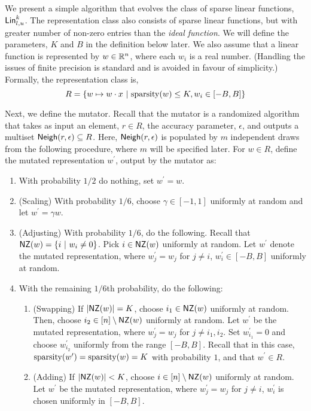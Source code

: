 We present a simple algorithm that evolves the class of sparse linear functions,
$\mathsf{Lin}^k_{l, u}$.  The representation class also consists of sparse linear
functions, but with greater number of non-zero entries than the \emph{ideal
function}. We will define the parameters, $K$ and $B$ in the definition below
later. We also assume that a linear function is represented by $w \in \mathbb{R}^n$,
where each $w_i$ is a real number. (Handling the issues of finite precision is
standard and is avoided in favour of simplicity.) Formally, the representation
class is,
\[ 
R = \{ w \mapsto w \cdot x ~|~ \mathrm{sparsity}(w) \leq K, w_i \in [-B, B] \}
\]

Next, we define the mutator. Recall that the mutator is a randomized algorithm
that takes as input an element, $r \in R$, the accuracy parameter, $\epsilon$,
and outputs a multiset $\mathsf{Neigh}(r, \epsilon) \subseteq R$. Here, $\mathsf{Neigh}(r,
\epsilon)$ is populated by $m$ independent draws from the following procedure,
where $m$ will be specified later. For $w \in R$, define the mutated
representation $w^\prime$, output by the mutator as:
\begin{enumerate}
%
%
\item With probability $1/2$ do nothing, set $w^\prime = w$. %
\item (Scaling) With probability $1/6$, choose $\gamma \in [-1, 1]$ uniformly at
random and let $w^\prime = \gamma w$. 
%
\item (Adjusting) With probability $1/6$, do the following. Recall that $\mathsf{NZ}(w)
= \{ i~|~ w_i \neq 0 \}$. Pick $i \in \mathsf{NZ}(w)$ uniformly at random. Let
$w^\prime$ denote the mutated representation, where $w^\prime_j = w_j$ for $j
\neq i$, $w^\prime_i \in [-B, B]$ uniformly at random. 
%
\item With the remaining $1/6$th probability, do the following:
\begin{enumerate}
\item (Swapping) If $|\mathsf{NZ}(w)| = K$, choose $i_1 \in \mathsf{NZ}(w)$ uniformly at random.
Then, choose $i_2 \in [n] \setminus \mathsf{NZ}(w)$ uniformly at random. Let $w^\prime$
be the mutated representation, where $w_j^\prime = w_j$ for $j \neq i_1, i_2$.
Set $w_{i_1}^\prime = 0$ and choose $w_{i_2}^\prime$ uniformly from the range
$[-B, B]$. Recall that in this case, $\mathrm{sparsity}(w^\prime) = \mathrm{sparsity}(w) = K$
with probability $1$, and that $w^\prime \in R$.
\item (Adding) If $|\mathsf{NZ}(w)| < K$, choose $i \in [n] \setminus \mathsf{NZ}(w)$ uniformly
at random. Let $w^\prime$ be the mutated representation, where $w_j^\prime =
w_j$ for $j \neq i$, $w^\prime_i$ is chosen uniformly in $[-B, B]$. 
\end{enumerate}
\end{enumerate}

